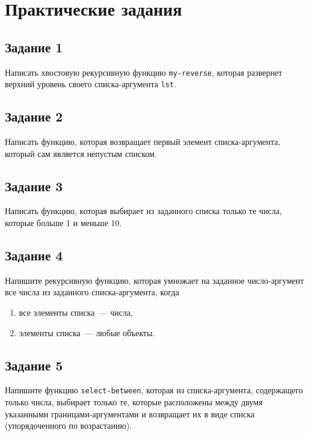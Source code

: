\chapter{Практические задания}

\section{Задание 1}

Написать хвостовую рекурсивную функцию \texttt{my-reverse}, которая развернет верхний уровень своего списка-аргумента \texttt{lst}.


\section{Задание 2}

Написать функцию, которая возвращает первый элемент списка-аргумента, который сам является непустым списком.


\section{Задание 3}

Написать функцию, которая выбирает из заданного списка только те числа, которые больше 1 и меньше 10.


\section{Задание 4}

Напишите рекурсивную функцию, которая умножает на заданное число-аргумент все числа из заданного списка-аргумента, когда
\begin{enumerate}[label=\alph*)]
	\item все элементы списка~--- числа,
	\item элементы списка~--- любые объекты.
\end{enumerate}


\section{Задание 5}

Напишите функцию \texttt{select-between}, которая из списка-аргумента, содержащего только числа, выбирает только те, которые расположены между двумя указанными границами-аргументами и возвращает их в виде списка (упорядоченного по возрастанию).

